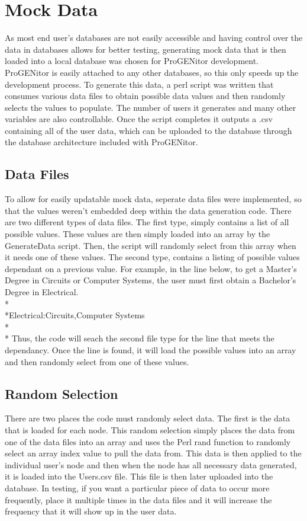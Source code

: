 \section{Mock Data}
\label{sect:mock-data}
As most end user's databases are not easily accessible and having control over
the data in databases allows for better testing, generating mock data that is
then loaded into a local database was chosen for ProGENitor development. 
ProGENitor is easily attached to any other databases, so this only speeds up the
development process.  To generate this data, a perl script was written that
consumes various data files to obtain possible data values and then randomly
selects the values to populate.  The number of users it generates and many other
variables are also controllable.  Once the script completes it outputs a .csv
containing all of the user data, which can be uploaded to the database through
the database architecture included with ProGENitor.

\subsection{Data Files}
To allow for easily updatable mock data, seperate data files were implemented,
so that the values weren't embedded deep within the data generation code.  There
are two different types of data files.  The first type, simply contains a list
of all possible values.  These values are then simply loaded into an array by
the GenerateData script.  Then, the script will randomly select from this
array when it needs one of these values.  The second type, contains a listing of
possible values dependant on a previous value.  For example, in the line below,
to get a Master's Degree in Circuits or Computer Systems, the user must first
obtain a Bachelor's Degree in Electrical.
\\*
\\*Electrical:Circuits,Computer Systems\\*
\\*
Thus, the code will seach the second file type for the line that meets the
dependancy.  Once the line is found, it will load the possible values into an
array and then randomly select from one of these values.

\subsection{Random Selection}
There are two places the code must randomly select data.  The first is the
data that is loaded for each node.  This random selection simply places the data
from one of the data files into an array and uses the Perl rand function to
randomly select an array index value to pull the data from.  This data is then
applied to the individual user's node and then when the node has all necessary
data generated, it is loaded into the Users.csv file.  This file is then later
uploaded into the database.  In testing, if you want a particular piece of data
to occur more frequently, place it multiple times in the data files and it
will increase the frequency that it will show up in the user data.

